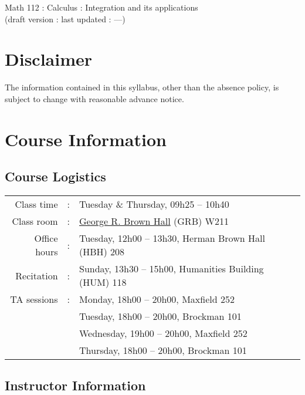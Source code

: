 


\begin{center}
{\Large Math 112 : Calculus : Integration and its applications}\\
{\scriptsize (draft version : last updated : \Year--\Month--\Day)}
\end{center}





\section{Disclaimer}

The information contained in this syllabus, other than the absence policy, is subject to change with reasonable advance notice.



%
%
%
%

\section{Course Information}



\subsection{Course Logistics}

\begin{tabular}{r c l}
Class time 	&	:	&	Tuesday \& Thursday, 09h25 -- 10h40	\\
Class room	&	:	&	\href{https://goo.gl/maps/CfwNovWqwqMdsBUV6}{George R. Brown Hall} (GRB) W211	\\
Office hours	&	:	&	Tuesday, 12h00 -- 13h30, Herman Brown Hall (HBH) 208	\\
Recitation		&	:	&	Sunday, 13h30 -- 15h00, Humanities Building (HUM) 118	\\
TA sessions	&	:	&	Monday, 18h00 -- 20h00, Maxfield 252		\\
			&		&	Tuesday, 18h00 -- 20h00, Brockman 101		\\
			&		&	Wednesday, 19h00 -- 20h00, Maxfield 252	\\
			&		&	Thursday, 18h00 -- 20h00, Brockman 101
\end{tabular}



\subsection{Instructor Information}


